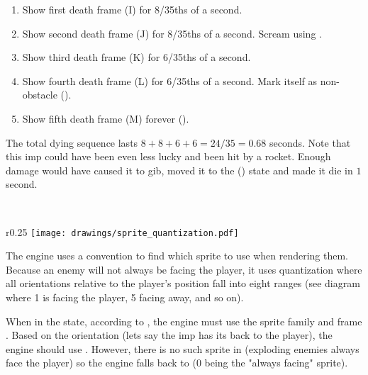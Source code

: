 \begin{enumerate}
\item Show first death frame (I) for 8/35ths of a second.
\item Show second death frame (J) for 8/35ths of a second. Scream using .
\item Show third death frame (K) for 6/35ths of a second.
\item Show fourth death frame (L) for 6/35ths of a second. Mark itself as non-obstacle ().
\item Show fifth death frame (M) forever ().
\end{enumerate}
\par
The total dying sequence lasts $8+8+6+6=24/35 = 0.68$ seconds. Note that this imp could have been even less lucky and been hit by a rocket. Enough damage would have caused it to gib, moved it to the  () state and made it die in $1$ second.\\
\par
{}\\
\par
{}




\par
\begin{wrapfigure}[9]{r}{0.25\textwidth}
\centering
\texttt{[image: drawings/sprite\_quantization.pdf]}
\end{wrapfigure}
The engine uses a convention to find which sprite to use when rendering them. Because an enemy will not always be facing the player, it uses quantization where all orientations relative to the player's position fall into eight ranges (see diagram where 1 is facing the player, 5 facing away, and so on).\\
\par
When in the  state, according to , the engine must use the sprite family  and frame . Based on the orientation (lets say the imp has its back to the player), the engine should use . However, there is no such sprite in  (exploding enemies always face the player) so the engine falls back to  (0 being the "always facing" sprite).\\
\par







